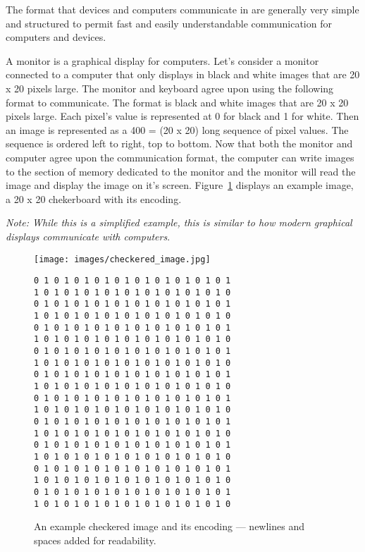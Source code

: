 The format that devices and computers communicate in are generally very simple
and structured to permit fast and easily understandable communication for
computers and devices.

\begin{example}
A monitor is a graphical display for computers. Let's consider a monitor
connected to a computer that only displays in black and white images
that are 20 x 20 pixels large. The monitor and keyboard agree upon using
the following format to communicate. The format is black and white images
that are 20 x 20 pixels large. Each pixel's value is represented at 0 for
black and 1 for white. Then an image is represented as a 400 = (20 x 20) long
sequence of pixel values. The sequence is ordered left to right, top to bottom.
Now that both the monitor and computer agree upon the communication format, the
computer can write images to the section of memory dedicated to the monitor
and the monitor will read the image and display the image on it's screen.
Figure~\ref{fig:hardware:monitor_image} displays an example image, a 
20 x 20 chekerboard with its encoding.

\emph{Note: While this is a simplified example, this is similar to how modern
  graphical displays communicate with computers}.
\end{example}

\begin{figure}
	\centering
        \hspace{0.5cm}
	\begin{minipage}{0.45\textwidth}
		\texttt{[image: images/checkered\_image.jpg]}
	\end{minipage}
        \begin{minipage}{0.45\textwidth}
		\scriptsize
\begin{verbatim}
0 1 0 1 0 1 0 1 0 1 0 1 0 1 0 1 0 1 0 1
1 0 1 0 1 0 1 0 1 0 1 0 1 0 1 0 1 0 1 0
0 1 0 1 0 1 0 1 0 1 0 1 0 1 0 1 0 1 0 1
1 0 1 0 1 0 1 0 1 0 1 0 1 0 1 0 1 0 1 0
0 1 0 1 0 1 0 1 0 1 0 1 0 1 0 1 0 1 0 1
1 0 1 0 1 0 1 0 1 0 1 0 1 0 1 0 1 0 1 0
0 1 0 1 0 1 0 1 0 1 0 1 0 1 0 1 0 1 0 1
1 0 1 0 1 0 1 0 1 0 1 0 1 0 1 0 1 0 1 0
0 1 0 1 0 1 0 1 0 1 0 1 0 1 0 1 0 1 0 1
1 0 1 0 1 0 1 0 1 0 1 0 1 0 1 0 1 0 1 0
0 1 0 1 0 1 0 1 0 1 0 1 0 1 0 1 0 1 0 1
1 0 1 0 1 0 1 0 1 0 1 0 1 0 1 0 1 0 1 0
0 1 0 1 0 1 0 1 0 1 0 1 0 1 0 1 0 1 0 1
1 0 1 0 1 0 1 0 1 0 1 0 1 0 1 0 1 0 1 0
0 1 0 1 0 1 0 1 0 1 0 1 0 1 0 1 0 1 0 1
1 0 1 0 1 0 1 0 1 0 1 0 1 0 1 0 1 0 1 0
0 1 0 1 0 1 0 1 0 1 0 1 0 1 0 1 0 1 0 1
1 0 1 0 1 0 1 0 1 0 1 0 1 0 1 0 1 0 1 0
0 1 0 1 0 1 0 1 0 1 0 1 0 1 0 1 0 1 0 1
1 0 1 0 1 0 1 0 1 0 1 0 1 0 1 0 1 0 1 0
\end{verbatim}
        \end{minipage}
	\caption{An example checkered image and its encoding --- newlines and spaces added for readability.}
	\label{fig:hardware:monitor_image}
\end{figure}

